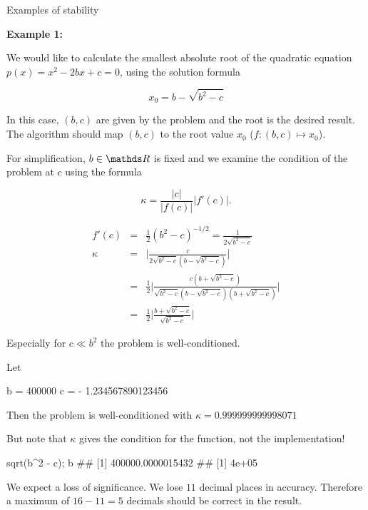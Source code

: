 \begin{vbframe}{Examples of stability}

\textbf{Example 1:}

We would like to calculate the smallest absolute root of the quadratic equation $p(x) = x^2 - 2 b x + c = 0$, using the solution formula

$$
x_0 = b - \sqrt{b^2 - c}
$$

In this case, $(b, c)$ are given by the problem and the root is the desired result. The algorithm should map $(b, c)$ to the root value $x_0$ ($f: (b, c)\mapsto x_0$).

\lz

For simplification, $b \in \R$ is fixed and we examine the condition of the problem at $c$ using the formula

$$
\kappa = \frac{|c|}{|f(c)|} |f'(c)|.
$$

\begin{eqnarray*}
f'(c) &=& \frac{1}{2} (b^2 - c)^{-1/2} = \frac{1}{2\sqrt{b^2 - c}} \\
\kappa &=& \bigg|\frac{c}{2\sqrt{b^2 - c}(b - \sqrt{b^2 - c})}\bigg| \\
&=& \frac{1}{2}\bigg| \frac{c (b + \sqrt{b^2 - c})}{\sqrt{b^2 - c}(b - \sqrt{b^2 - c})(b + \sqrt{b^2 - c})}\bigg| \\
&=& \frac{1}{2}\bigg|\frac{b + \sqrt{b^2 - c}}{\sqrt{b^2 - c}}\bigg| 
\end{eqnarray*}

Especially for $c \ll b^2$ the problem is well-conditioned.

\framebreak

Let
\vspace{0.2cm}
\footnotesize

\begin{verbbox}
b = 400000
c = - 1.234567890123456
\end{verbbox}
\par\colorbox{code}{\parbox{\textwidth}{\theverbbox}}\par
\normalsize
\vspace{0.2cm}
Then the problem is well-conditioned with $\kappa =  0.999999999998071$



\lz
But note that $\kappa$ gives the condition for the function, not the implementation!
\footnotesize
\vspace{0.2cm}
\begin{verbbox}
sqrt(b^2 - c); b
## [1] 400000.0000015432
## [1] 4e+05
\end{verbbox}
\par\colorbox{code}{\parbox{\textwidth}{\theverbbox}}\par
\vspace{0.2cm}
\normalsize
We expect a loss of significance. 
We lose $11$ decimal places in accuracy. 
Therefore a maximum of $16 - 11 = 5$ decimals should be correct in the result.


\end{vbframe}
